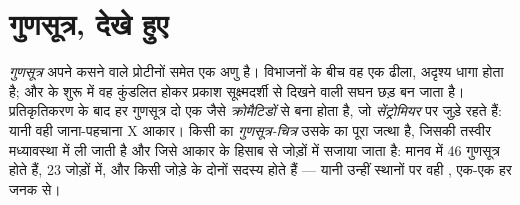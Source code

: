 \section{गुणसूत्र, देखे हुए}

\begin{definition}[गुणसूत्र, क्रोमैटिड, गुणसूत्र-चित्र]\label{def:g11:cell-cycle-mitosis:chromosome}
\emph{गुणसूत्र} अपने कसने वाले प्रोटीनों समेत एक  अणु है। विभाजनों के
बीच वह एक ढीला, अदृश्य धागा होता है; और  के शुरू में वह
कुंडलित होकर प्रकाश सूक्ष्मदर्शी से दिखने वाली सघन छड़ बन जाता है।
प्रतिकृतिकरण के बाद हर गुणसूत्र दो एक जैसे
\emph{क्रोमैटिडों} से बना होता है, जो
\emph{सेंट्रोमियर} पर जुड़े रहते हैं: यानी वही जाना-पहचाना
X आकार। किसी  का \emph{गुणसूत्र-चित्र} उसके
 का पूरा जत्था है, जिसकी तस्वीर मध्यावस्था में ली जाती है और जिसे
आकार के हिसाब से जोड़ों में सजाया जाता है: मानव  में 46 गुणसूत्र
होते हैं, 23 जोड़ों में, और किसी जोड़े के दोनों सदस्य \emph{} होते
हैं --- यानी उन्हीं स्थानों पर वही , एक-एक हर जनक से।
\end{definition}

